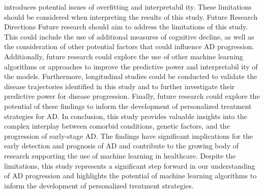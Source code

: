 \documentclass[conference]{IEEEtran}
\begin{document}
introduces potential issues of overfitting and interpretabil ity. These limitations should be considered when interpreting the results of this study. Future Research Directions Future research should aim to address the limitations of this study. This could include the use of additional measures of cognitive decline, as well as the consideration of other potential factors that could influence AD progression. Additionally, future research could explore the use of other machine learning algorithms or approaches to improve the predictive power and interpretabil ity of the models. Furthermore, longitudinal studies could be conducted to validate the disease trajectories identified in this study and to further investigate their predictive power for disease progression. Finally, future research could explore the potential of these findings to inform the development of personalized treatment strategies for AD. In conclusion, this study provides valuable insights into the complex interplay between comorbid conditions, genetic factors, and the progression of early-stage AD. The findings have significant implications for the early detection and prognosis of AD and contribute to the growing body of research supporting the use of machine learning in healthcare. Despite the limitations, this study represents a significant step forward in our understanding of AD progression and highlights the potential of machine learning algorithms to inform the development of personalized treatment strategies.
\end{document}
